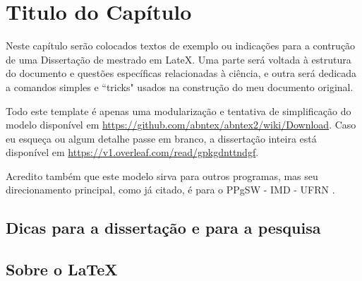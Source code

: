 \chapter{Titulo do Capítulo}
\label{cap:cap1}

Neste capítulo serão colocados textos de exemplo ou indicações para a contrução de uma Dissertação de mestrado em LateX. Uma parte será voltada à estrutura do documento e questões específicas relacionadas à ciência, e outra será dedicada a comandos simples e ``tricks" usados na construção do meu documento original.

Todo este template é apenas uma modularização e tentativa de simplificação do modelo disponível em \url{https://github.com/abntex/abntex2/wiki/Download}. Caso eu esqueça ou algum detalhe passe em branco, a dissertação inteira está disponível em \url{https://v1.overleaf.com/read/gpkgdnttndgf}.

Acredito também que este modelo sirva para outros programas, mas seu direcionamento principal, como já citado, é para o PPgSW - IMD - UFRN \cite{xiao_study_2011}. %

\section{Dicas para a dissertação e para a pesquisa}

\section{Sobre o \LaTeX}